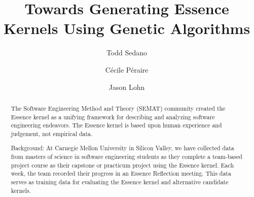 \documentclass[3p,times,procedia]{elsarticle}
\begin{document}
\begin{frontmatter}




\title{Towards Generating Essence Kernels Using Genetic Algorithms}

\author{Todd Sedano}

\author{C\'ecile P\'eraire}

\author{Jason Lohn}


\address{Carnegie Mellon University}
\address{Silicon Valley Campus}
\address{Moffett Field, CA 94035, USA}


\begin{abstract}
The Software Engineering Method and Theory (SEMAT) community created the Essence kernel as a unifying framework for describing and analyzing software engineering endeavors. The Essence kernel is based upon human experience and judgement, not empirical data. 

Background: At Carnegie Mellon University in Silicon Valley, we have collected data from masters of science in software engineering students as they complete a team-based project course as their capstone or practicum project using the Essence kernel. Each week, the team recorded their progress in an Essence Reflection meeting. This data serves as training data for evaluating the Essence kernel and alternative candidate kernels.


\end{abstract}
\end{frontmatter}
\end{document}
